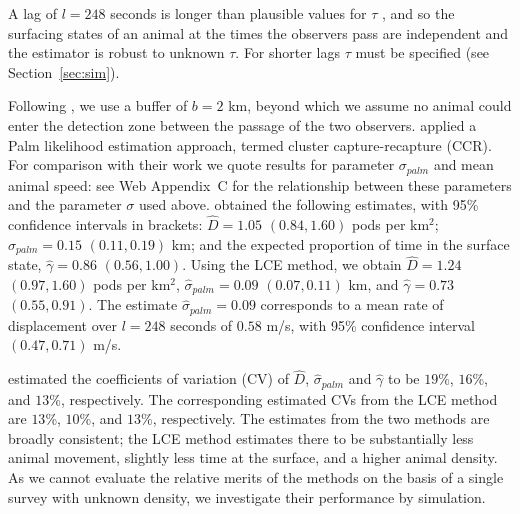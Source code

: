 \documentclass[useAMS, usenatbib, referee]{biom}\usepackage[]{graphicx}\usepackage[]{color}
\begin{document}
A lag of $l=248$ seconds is longer than plausible values for $\tau$ \citep{Stevenson+al:19}, and so the surfacing states of an animal at the times the observers pass are independent and the estimator is robust to unknown $\tau$. For shorter lags $\tau$ must be specified (see Section~\ref{sec:sim}).




Following \cite{Stevenson+al:19}, we use a buffer of $b=2$ km, beyond which we assume no animal could enter the detection zone between the passage of the two observers.  \cite{Stevenson+al:19} applied a Palm likelihood estimation approach, termed cluster capture-recapture (CCR).
For comparison with their work we quote results for parameter $\sigma_{palm}$ and mean animal speed: see Web Appendix~C for the relationship between these parameters and the parameter $\sigma$ used above. \cite{Stevenson+al:19} obtained the following estimates, with 95\% confidence intervals in brackets: $\hat{D}=1.05$ $(0.84, 1.60)$ pods per km$^2$; $\hat{\sigma}_{palm}=0.15$ $(0.11, 0.19)$ km; and the expected proportion of time in the surface state, $\hat{\gamma}=0.86$ $(0.56, 1.00)$. Using the LCE method, we obtain $\hat{D}=1.24$ $(0.97, 1.60)$ pods per km$^2$, $\hat{\sigma}_{palm}=0.09$ $(0.07, 0.11)$ km, and $\hat{\gamma}=0.73$ $(0.55, 0.91)$. The estimate $\hat{\sigma}_{palm}=0.09$ corresponds to a mean rate of displacement over $l=248$ seconds of $0.58$ m/s, with 95\% confidence interval $(0.47, 0.71)$ m/s.

\cite{Stevenson+al:19} estimated the coefficients of variation (CV) of $\hat{D}$, $\hat{\sigma}_{palm}$ and $\hat{\gamma}$ to be $19$\%, $16$\%, and $13$\%, respectively. The corresponding estimated CVs from the LCE method are $13$\%, $10$\%, and $13$\%, respectively. The estimates from the two methods are broadly consistent; the LCE method estimates there to be substantially less animal movement, slightly less time at the surface, and a higher animal density. As we cannot evaluate the relative merits of the methods on the basis of a single survey with unknown density, we investigate their performance by simulation.
\end{document}
